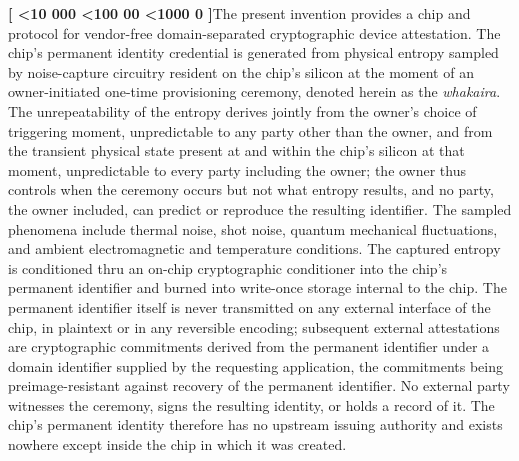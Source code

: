 \documentclass[12pt,letterpaper]{article}
\newcounter{para}
\newcommand{\padzero}{%
  \ifnum\value{para}<10 000\else%
  \ifnum\value{para}<100 00\else%
  \ifnum\value{para}<1000 0\else%
  \fi\fi\fi}
\newcommand{\para}{%
  \refstepcounter{para}\noindent\textbf{[\padzero\arabic{para}]}\hspace{0.5em}\ignorespaces}
\begin{document}
\para The present invention provides a chip and protocol for vendor-free domain-separated cryptographic device attestation. The chip's permanent identity credential is generated from physical entropy sampled by noise-capture circuitry resident on the chip's silicon at the moment of an owner-initiated one-time provisioning ceremony, denoted herein as the \emph{whakaira}. The unrepeatability of the entropy derives jointly from the owner's choice of triggering moment, unpredictable to any party other than the owner, and from the transient physical state present at and within the chip's silicon at that moment, unpredictable to every party including the owner; the owner thus controls when the ceremony occurs but not what entropy results, and no party, the owner included, can predict or reproduce the resulting identifier. The sampled phenomena include thermal noise, shot noise, quantum mechanical fluctuations, and ambient electromagnetic and temperature conditions. The captured entropy is conditioned thru an on-chip cryptographic conditioner into the chip's permanent identifier and burned into write-once storage internal to the chip. The permanent identifier itself is never transmitted on any external interface of the chip, in plaintext or in any reversible encoding; subsequent external attestations are cryptographic commitments derived from the permanent identifier under a domain identifier supplied by the requesting application, the commitments being preimage-resistant against recovery of the permanent identifier. No external party witnesses the ceremony, signs the resulting identity, or holds a record of it. The chip's permanent identity therefore has no upstream issuing authority and exists nowhere except inside the chip in which it was created.
\end{document}
